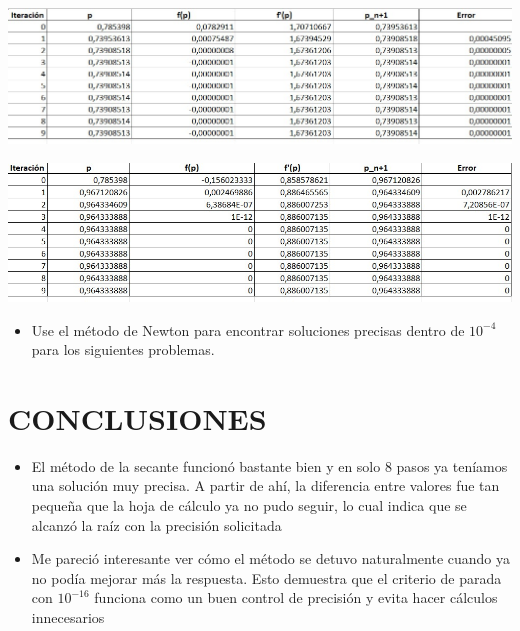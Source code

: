 \documentclass[12pt]{article}
\begin{document}
\begin{minipage}{0.95\textwidth}
    \raggedleft
    \includegraphics[width=1.15\textwidth]{inFiles/Figures/ejer6.jpg}
\end{minipage}
\vspace{1.5cm}


\begin{minipage}{0.95\textwidth}
    \raggedleft
    \includegraphics[width=1.15\textwidth]{inFiles/Figures/ejer7.jpg}
\end{minipage}
\vspace{1.5cm}

\begin{itemize}
    \item { Use el método de Newton para encontrar soluciones precisas dentro de $10^{-4}$ para los siguientes problemas.}
\end{itemize}

\section*{CONCLUSIONES}
\begin{itemize}
    \item {El método de la secante funcionó bastante bien y en solo 8 pasos 
    ya teníamos una solución muy precisa. A partir de ahí, la diferencia entre valores fue tan pequeña 
    que la hoja de cálculo ya no pudo seguir, lo cual indica que se alcanzó la raíz con la precisión solicitada}

    \item {Me pareció interesante ver cómo el método se detuvo naturalmente cuando ya no podía mejorar más la respuesta. 
    Esto demuestra que el criterio de parada con $10^{-16}$ funciona como un buen control de precisión y evita hacer cálculos innecesarios}
\end{itemize}


\vspace{0.5cm}
\end{document}
